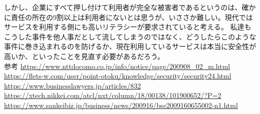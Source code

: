 \documentclass[11pt]{article}
\begin{document}
しかし、企業にすべて押し付けて利用者が完全な被害者であるというのは、確かに責任の所在の9割以上は利用者にないとは思うが、いささか難しい。現代ではサービスを利用する側にも高いリテラシーが要求されていると考える。
私達もこうした事件を他人事だとして流してしまうのではなく、どうしたらこのような事件に巻き込まれるのを防げるか、現在利用しているサービスは本当に安全性が高いか、といったことを見直す必要があるだろう。
\\ 参考
\url{https://www.nttdocomo.co.jp/info/notice/page/200908_02_m.html}\\
\url{https://flets-w.com/user/point-otoku/knowledge/security/security24.html}\\
\url{https://www.businesslawyers.jp/articles/832}\\
\url{https://xtech.nikkei.com/atcl/nxt/column/18/00138/101900652/?P=2}\\
\url{https://www.sankeibiz.jp/business/news/200916/bse2009160655002-n1.html}\\
\end{document}
